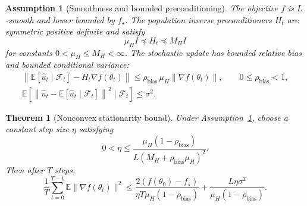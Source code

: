\documentclass[10pt,a4paper]{amsart}
\newtheorem{assumption}{Assumption}
\newtheorem{theorem}{Theorem}
\newcommand{\E}{\mathbb{E}}
\begin{document}
\begin{assumption}[Smoothness and bounded preconditioning]
\label{ass:smooth}
The objective $f$ is $L$-smooth and lower bounded by $f_\star$. The population inverse preconditioners $H_t$ are symmetric positive definite and satisfy
\begin{equation}
    \mu_H I \preceq H_t \preceq M_H I
\end{equation}
for constants $0<\mu_H\le M_H<\infty$. The stochastic update has bounded relative bias and bounded conditional variance:
\begin{equation}
    \begin{aligned}
    \left\|
    \E[\hat u_t\mid\mathcal F_t]
    -
    H_t\nabla f(\theta_t)
    \right\|
    \le
    \rho_{\mathrm{bias}}\,\mu_H\|\nabla f(\theta_t)\|,
    \qquad
    0\le \rho_{\mathrm{bias}}<1,\\
    \E\!\left[
    \left\|
    \hat u_t-\E[\hat u_t\mid\mathcal F_t]
    \right\|^2
    \mid\mathcal F_t
    \right]
    \le
    \sigma^2.
    \end{aligned}
\end{equation}
\end{assumption}

\begin{theorem}[Nonconvex stationarity bound]
\label{thm:nonconvex}
Under Assumption~\ref{ass:smooth}, choose a constant step size $\eta$ satisfying
\begin{equation}
    0<\eta
    \le
    \frac{\mu_H(1-\rho_{\mathrm{bias}})}
    {L(M_H+\rho_{\mathrm{bias}}\mu_H)^2}.
\end{equation}
Then after $T$ steps,
\begin{equation}
    \frac{1}{T}
    \sum_{t=0}^{T-1}
    \E\|\nabla f(\theta_t)\|^2
    \le
    \frac{2(f(\theta_0)-f_\star)}
    {\eta T\mu_H(1-\rho_{\mathrm{bias}})}
    +
    \frac{L\eta\sigma^2}
    {\mu_H(1-\rho_{\mathrm{bias}})}.
\end{equation}
\end{theorem}
\end{document}
